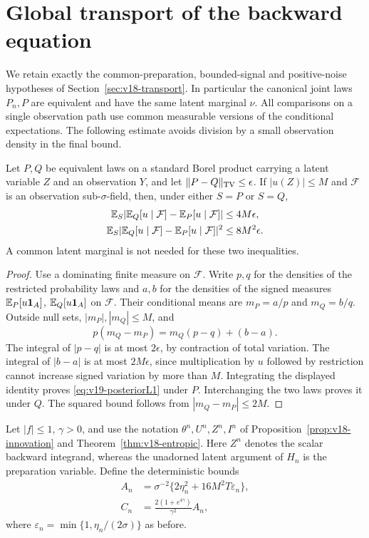 \section{Global transport of the backward equation}
\label{sec:v19-global}
We retain exactly the common-preparation, bounded-signal and positive-noise
hypotheses of Section~\ref{sec:v18-transport}. In particular the canonical
joint laws $P_n,P$ are equivalent and have the same latent marginal $\nu$.
All comparisons on a single observation path use common measurable versions
of the conditional expectations. The following estimate avoids division by
a small observation density in the final bound.

\begin{lemma}
\label{lem:v19-posterior}
Let $P,Q$ be equivalent laws on a standard Borel product carrying a latent
variable $Z$ and an observation $Y$, and let
$\|P-Q\|_{\rm TV}\le\epsilon$. If $|u(Z)|\le M$ and $\mathcal F$ is
an observation sub-$\sigma$-field, then, under either $S=P$ or $S=Q$,
\begin{align}
 \mathbb E_S|\mathbb E_Q[u\mid\mathcal F]-\mathbb E_P[u\mid\mathcal F]|
       &\le4M\epsilon,\label{eq:v19-posteriorL1}\\
 \mathbb E_S|\mathbb E_Q[u\mid\mathcal F]-\mathbb E_P[u\mid\mathcal F]|^2
       &\le8M^2\epsilon.\label{eq:v19-posteriorL2}
\end{align}
A common latent marginal is not needed for these two inequalities.
\end{lemma}
\begin{proof}
Use a dominating finite measure on $\mathcal F$. Write $p,q$ for the
densities of the restricted probability laws and $a,b$ for the densities
of the signed measures $\mathbb E_P[u\mathbf 1_A]$, $\mathbb E_Q[u\mathbf 1_A]$ on $\mathcal F$.
Their conditional means are $m_P=a/p$ and $m_Q=b/q$. Outside null sets,
$|m_P|,|m_Q|\le M$, and
\[
 p(m_Q-m_P)=m_Q(p-q)+(b-a).
\]
The integral of $|p-q|$ is at most $2\epsilon$, by contraction of total
variation. The integral of $|b-a|$ is at most $2M\epsilon$, since
multiplication by $u$ followed by restriction cannot increase signed
variation by more than $M$. Integrating the displayed identity proves
\eqref{eq:v19-posteriorL1} under $P$. Interchanging the two laws proves it
under $Q$. The squared bound follows from $|m_Q-m_P|\le2M$.
\end{proof}

Let $|f|\le1$, $\gamma>0$, and use the notation $\theta^n,U^n,Z^n,I^n$
of Proposition~\ref{prop:v18-innovation} and
Theorem~\ref{thm:v18-entropic}. Here $Z^n$ denotes the scalar backward
integrand, whereas the unadorned latent argument of $H_n$ is the preparation
variable. Define the deterministic bounds
\begin{align}
 A_n&=\sigma^{-2}\{2\eta_n^2+16M^2T\varepsilon_n\},
       \label{eq:v19-An}\\
 C_n&=\frac{2(1+e^{4\gamma})}{\gamma^2}A_n,
       \label{eq:v19-Cn}
\end{align}
where $\varepsilon_n=\min\{1,\eta_n/(2\sigma)\}$ as before.


